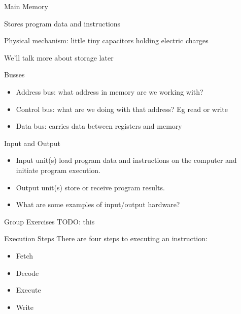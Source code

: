 \begin{frame}{Main Memory}

	Stores program data and instructions

	Physical mechanism: little tiny capacitors holding electric charges

	We'll talk more about storage later

\end{frame}


\begin{frame}{Busses}
	\begin{itemize}
		\item Address bus: what address in memory are we working with?
		\item Control bus: what are we doing with that address? Eg read or write
		\item Data bus: carries data between registers and memory
	\end{itemize}
\end{frame}


\begin{frame}{Input and Output}

	\begin{itemize}
		\item Input unit(s) load program data and instructions on the computer and initiate program execution.
		\item Output unit(s) store or receive program results.
		\item What are some examples of input/output hardware?
	\end{itemize}

\end{frame}

\begin{frame}{Group Exercises}
	TODO: this
\end{frame}



\begin{frame}{Execution Steps}
	There are four steps to executing an instruction:
	\begin{itemize}
		\item Fetch
		\item Decode
		\item Execute
		\item Write
	\end{itemize}
\end{frame}

